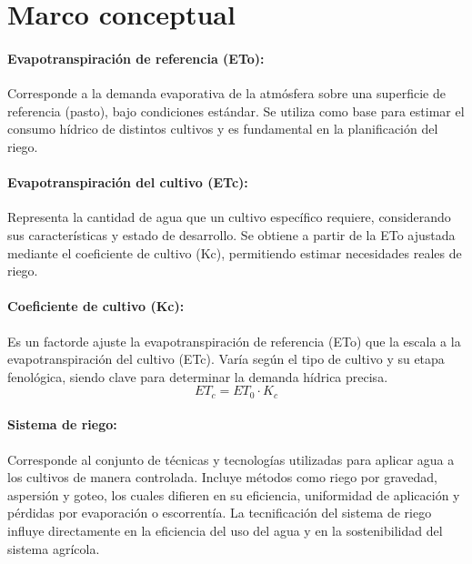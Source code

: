 \documentclass[12pt]{report}
\begin{document}
\section{Marco conceptual}

\vspace{0.3cm}

\paragraph{Evapotranspiración de referencia (ETo):} 
Corresponde a la demanda evaporativa de la atmósfera sobre una superficie de referencia (pasto), bajo condiciones estándar. Se utiliza como base para estimar el consumo hídrico de distintos cultivos y es fundamental en la planificación del riego.

\vspace{0.2cm}

\paragraph{Evapotranspiración del cultivo (ETc):} 
Representa la cantidad de agua que un cultivo específico requiere, considerando sus características y estado de desarrollo. Se obtiene a partir de la ETo ajustada mediante el coeficiente de cultivo (Kc), permitiendo estimar necesidades reales de riego.

\vspace{0.2cm}

\paragraph{Coeficiente de cultivo (Kc):} 
Es un factorde ajuste la evapotranspiración de referencia (ETo) que la escala a la evapotranspiración del cultivo (ETc). Varía según el tipo de cultivo y su etapa fenológica, siendo clave para determinar la demanda hídrica precisa.
\begin{equation}
ET_c = ET_0 \cdot K_c
\end{equation}

\vspace{0.2cm}

\paragraph{Sistema de riego:} 
Corresponde al conjunto de técnicas y tecnologías utilizadas para aplicar agua a los cultivos de manera controlada. Incluye métodos como riego por gravedad, aspersión y goteo, los cuales difieren en su eficiencia, uniformidad de aplicación y pérdidas por evaporación o escorrentía. La tecnificación del sistema de riego influye directamente en la eficiencia del uso del agua y en la sostenibilidad del sistema agrícola.
\end{document}
